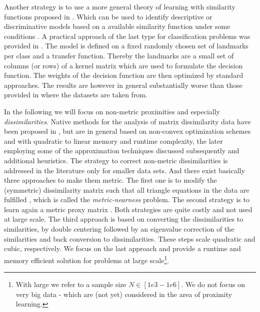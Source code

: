 \documentclass[twoside,11pt]{article}
\begin{document}
Another strategy is to use a more general theory of learning with similarity functions proposed in \cite{DBLP:journals/ml/BalcanBS08}.
Which can be used to identify descriptive or discriminative models based on a available similarity function under some conditions
\cite{DBLP:conf/nips/KarJ12}. A practical approach of the last type for classification problems was provided in \cite{DBLP:conf/nips/KarJ11}. 
The model is defined on a fixed randomly chosen set of landmarks per class and a transfer function. Thereby the landmarks are a small set of columns
(or rows) of a kernel matrix which are used to formulate the decision function. The weights of the decision
function are then optimized by standard approaches. The results are however in general substantially worse than those provided in 
\cite{DBLP:journals/jmlr/ChenGGRC09} where the datasets are taken from.  


In the following we will focus on non-metric proximities and especially \emph{dissimilarities}. Native methods for the analysis of matrix dissimilarity data 
have been proposed in \cite{DBLP:journals/neco/GraepelO99,Pekalska2005a,DBLP:journals/jmlr/PekalskaPD01,Schleif2012k}, but are in general based on non-convex optimization schemes 
and with quadratic to linear memory and runtime complexity, the later employing some of the approximation techniques discussed subsequently 
and additional heuristics. The strategy to correct non-metric dissimilarities is addressed in the literature only for smaller data sets.  And there exist
basically three approaches to make them metric. The first one is to modify the (symmetric) dissimilarity matrix such that all triangle equations
in the data are fulfilled \cite{DBLP:journals/siammax/BrickellDST08}, which is called the \emph{metric-nearness} problem. The second strategy
is to learn again a metric proxy matrix \cite{Lu30082005}. Both strategies are quite costly and not used at large scale. The third approach 
is based on converting the dissimilarities to similarities, by double centering followed by an eigenvalue correction of the similarities and
back conversion to dissimilarities. These steps scale quadratic and cubic, respectively. We focus on the last approach and provide a runtime
and memory efficient solution for problems at large scale\footnote{With large we refer to a sample size $N \in [1e3-1e6]$. We do not focus
on very big data - which are (not yet) considered in the area of proximity learning.}. 
\end{document}
